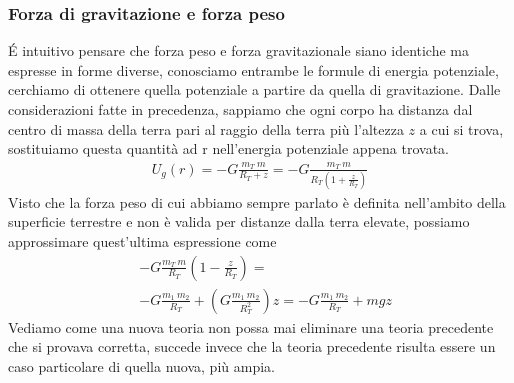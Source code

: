 \documentclass[10pt,a4paper]{article}
\begin{document}
\subsubsection{Forza di gravitazione e forza peso}
\'{E} intuitivo pensare che forza peso e forza gravitazionale siano identiche ma espresse in forme diverse, conosciamo entrambe le formule di energia potenziale, cerchiamo di ottenere quella potenziale a partire da quella di gravitazione. Dalle considerazioni fatte in precedenza, sappiamo che ogni corpo ha distanza dal centro di massa della terra pari al raggio della terra più l'altezza $z$ a cui si trova, sostituiamo questa quantità ad r nell'energia potenziale appena trovata.
\begin{align*}
U_g(r) = -G\frac{m_T\ m}{R_T+z} = -G\frac{m_T\ m}{R_T(1+\frac{z}{R_T})}
\end{align*}
Visto che la forza peso di cui abbiamo sempre parlato è definita nell'ambito della superficie terrestre e non è valida per distanze dalla terra elevate, possiamo approssimare quest'ultima espressione come
\begin{align*}
&-G\frac{m_T\ m}{R_T}(1-\frac{z}{R_T})=\\
&-G\frac{m_1\ m_2}{R_T} + (G\frac{m_1\ m_2}{R_T^2})z = -G\frac{m_1\ m_2}{R_T} + mg z
\end{align*}
Vediamo come una nuova teoria non possa mai eliminare una teoria precedente che si provava corretta, succede invece che la teoria precedente risulta essere un caso particolare di quella nuova, più ampia. 
\end{document}
